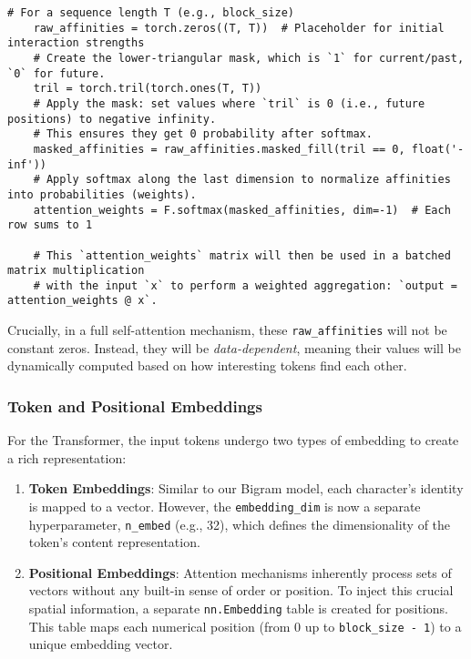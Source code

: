 \begin{enumerate}
    \begin{lstlisting}[caption={Masked softmax for attention weights}]
    # For a sequence length T (e.g., block_size)
    raw_affinities = torch.zeros((T, T))  # Placeholder for initial interaction strengths
    # Create the lower-triangular mask, which is `1` for current/past, `0` for future.
    tril = torch.tril(torch.ones(T, T))
    # Apply the mask: set values where `tril` is 0 (i.e., future positions) to negative infinity.
    # This ensures they get 0 probability after softmax.
    masked_affinities = raw_affinities.masked_fill(tril == 0, float('-inf'))
    # Apply softmax along the last dimension to normalize affinities into probabilities (weights).
    attention_weights = F.softmax(masked_affinities, dim=-1)  # Each row sums to 1
    
    # This `attention_weights` matrix will then be used in a batched matrix multiplication
    # with the input `x` to perform a weighted aggregation: `output = attention_weights @ x`.
    \end{lstlisting}
    
    Crucially, in a full self-attention mechanism, these \texttt{raw\_affinities} will not be constant zeros. Instead, they will be \textit{data-dependent}, meaning their values will be dynamically computed based on how interesting tokens find each other.
\end{enumerate}

\subsubsection{Token and Positional Embeddings}

For the Transformer, the input tokens undergo two types of embedding to create a rich representation:
\begin{enumerate}
    \item \textbf{Token Embeddings}: Similar to our Bigram model, each character's identity is mapped to a vector. However, the \texttt{embedding\_dim} is now a separate hyperparameter, \texttt{n\_embed} (e.g., 32), which defines the dimensionality of the token's content representation.
    \item \textbf{Positional Embeddings}: Attention mechanisms inherently process sets of vectors without any built-in sense of order or position. To inject this crucial spatial information, a separate \texttt{nn.Embedding} table is created for positions. This table maps each numerical position (from 0 up to \texttt{block\_size - 1}) to a unique embedding vector.
\end{enumerate}


